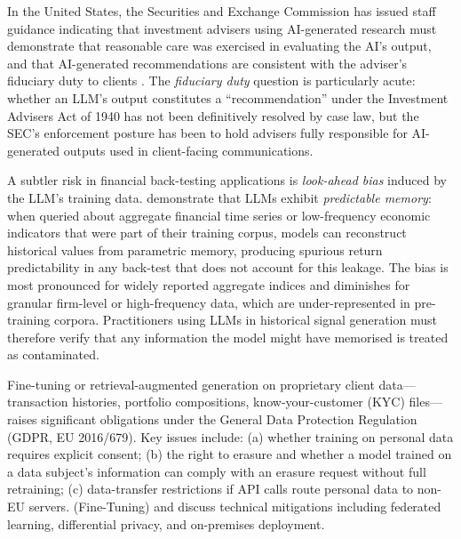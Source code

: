 \begin{context}
In the United States, the Securities and Exchange Commission has issued staff guidance indicating that
investment advisers using AI-generated research must demonstrate that reasonable care
was exercised in evaluating the AI's output, and that AI-generated recommendations are
consistent with the adviser's fiduciary duty to clients \citep{sec2023ai}.
The \emph{fiduciary duty} question is particularly acute: whether an LLM's output
constitutes a ``recommendation'' under the Investment Advisers Act of 1940 has not
been definitively resolved by case law, but the SEC's enforcement posture has been to
hold advisers fully responsible for AI-generated outputs used in client-facing
communications.

A subtler risk in financial back-testing applications is \emph{look-ahead bias} induced
by the LLM's training data.  \citet{didisheim2025memory} demonstrate that LLMs exhibit
\emph{predictable memory}: when queried about aggregate financial time series or
low-frequency economic indicators that were part of their training corpus, models can
reconstruct historical values from parametric memory, producing spurious return
predictability in any back-test that does not account for this leakage.  The bias is
most pronounced for widely reported aggregate indices and diminishes for granular
firm-level or high-frequency data, which are under-represented in pre-training corpora.
Practitioners using LLMs in historical signal generation must therefore verify that
any information the model might have memorised is treated as contaminated.

Fine-tuning or retrieval-augmented generation on proprietary client data---transaction
histories, portfolio compositions, know-your-customer (KYC) files---raises significant
obligations under the General Data Protection Regulation \citep{gdpr2016} (GDPR, EU 2016/679).
Key issues include: (a) whether training on personal data requires explicit consent;
(b) the right to erasure and whether a model trained on a data subject's information
can comply with an erasure request without full retraining; (c) data-transfer
restrictions if API calls route personal data to non-EU servers.  
(Fine-Tuning) and  discuss technical mitigations
including federated learning, differential privacy, and on-premises deployment.


\end{context}
